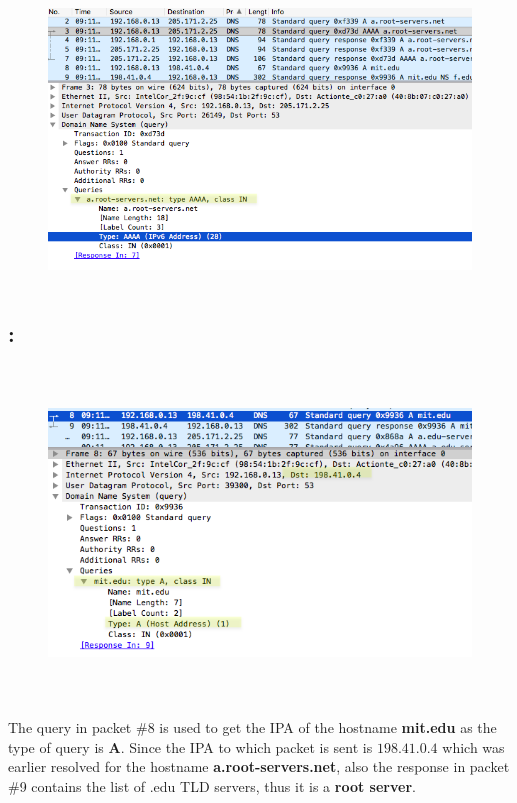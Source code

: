\documentclass[]{report}
\begin{document}
\begin{figure}[H]
	\vspace{0pt}
	\includegraphics[height = 220pt, keepaspectratio]{Snapshots/q3/3_4_2.png}
\end{figure}

\subsection{:}
\begin{figure}[H]
	\vspace{0pt}
	\includegraphics[height = 250pt, keepaspectratio]{Snapshots/q3/3_5.png}
\end{figure}
The query in packet \#8 is used to get the IPA of the hostname \textbf{mit.edu}  as the type of query is \textbf{A}. Since the IPA to which packet is sent is $198.41.0.4$ which was earlier resolved for the hostname \textbf{a.root-servers.net}, also the response in packet \#9 contains the list of .edu TLD servers, thus it is a \textbf{root server}.
\end{document}
